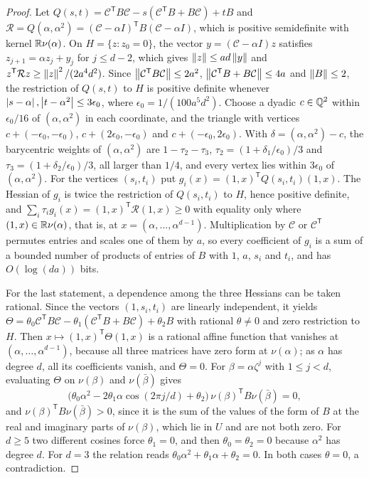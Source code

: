 \begin{proof}
Let $Q(s,t)=\mathcal C^{\mathsf T}B\mathcal C-s(\mathcal C^{\mathsf
T}B+B\mathcal C)+tB$ and $\mathcal R=Q(\alpha,\alpha^2)=(\mathcal C-\alpha
I)^{\mathsf T}B(\mathcal C-\alpha I)$, which is positive semidefinite with
kernel $\mathbb R\nu(\alpha)$. On $H=\{z:z_0=0\}$, the vector $y=(\mathcal C-\alpha
I)z$ satisfies $z_{j+1}=\alpha z_j+y_j$ for $j\le d-2$, which gives
$\left\lVert z\right\rVert\le ad\left\lVert y\right\rVert$ and $z^{\mathsf T}\mathcal Rz\ge\left\lVert z\right\rVert^2/(2a^4d^2)$.
Since $\left\lVert\mathcal C^{\mathsf T}B\mathcal C\right\rVert\le2a^2$,
$\left\lVert\mathcal C^{\mathsf T}B+B\mathcal C\right\rVert\le4a$ and $\left\lVert B\right\rVert\le2$, the
restriction of $Q(s,t)$ to $H$ is positive definite whenever
$\left\lvert s-\alpha\right\rvert,\left\lvert t-\alpha^2\right\rvert\le3\epsilon_0$, where
$\epsilon_0=1/(100a^5d^2)$. Choose a dyadic $c\in\mathbb Q^2$ within $\epsilon_0/16$
of $(\alpha,\alpha^2)$ in each coordinate, and the triangle with vertices
$c+(-\epsilon_0,-\epsilon_0)$, $c+(2\epsilon_0,-\epsilon_0)$ and
$c+(-\epsilon_0,2\epsilon_0)$. With $\delta=(\alpha,\alpha^2)-c$, the
barycentric weights of $(\alpha,\alpha^2)$ are $1-\tau_2-\tau_3$,
$\tau_2=(1+\delta_1/\epsilon_0)/3$ and $\tau_3=(1+\delta_2/\epsilon_0)/3$, all
larger than $1/4$, and every vertex lies within $3\epsilon_0$ of
$(\alpha,\alpha^2)$. For the vertices $(s_i,t_i)$ put
$g_i(x)=(1,x)^{\mathsf T}Q(s_i,t_i)(1,x)$. The Hessian of $g_i$ is twice the
restriction of $Q(s_i,t_i)$ to $H$, hence positive definite, and
$\sum_i\tau_ig_i(x)=(1,x)^{\mathsf T}\mathcal R(1,x)\ge0$ with equality only
where $(1,x)\in\mathbb R\nu(\alpha)$, that is, at $x=(\alpha,\ldots,\alpha^{d-1})$.
Multiplication by $\mathcal C$ or $\mathcal C^{\mathsf T}$ permutes entries
and scales one of them by $a$, so every coefficient of $g_i$ is a sum of a
bounded number of products of entries of $B$ with $1$, $a$, $s_i$ and $t_i$,
and has $O(\log(da))$ bits.

For the last statement, a dependence among the three Hessians can be taken
rational. Since the vectors $(1,s_i,t_i)$ are linearly independent, it yields
$\Theta=\theta_0\mathcal C^{\mathsf T}B\mathcal C-\theta_1(\mathcal C^{\mathsf
T}B+B\mathcal C)+\theta_2B$ with rational $\theta\ne0$ and zero restriction to
$H$. Then $x\mapsto(1,x)^{\mathsf T}\Theta(1,x)$ is a rational affine function
that vanishes at $(\alpha,\ldots,\alpha^{d-1})$, because all three matrices
have zero form at $\nu(\alpha)$; as $\alpha$ has degree $d$, all its
coefficients vanish, and $\Theta=0$. For $\beta=\alpha\zeta^j$ with $1\le j<d$,
evaluating $\Theta$ on $\nu(\beta)$ and $\nu(\bar\beta)$ gives
\[
\bigl(\theta_0\alpha^2-2\theta_1\alpha\cos(2\pi j/d)+\theta_2\bigr)\,
\nu(\beta)^{\mathsf T}B\nu(\bar\beta)=0,
\]
and $\nu(\beta)^{\mathsf T}B\nu(\bar\beta)>0$, since it is the sum of the
values of the form of $B$ at the real and imaginary parts of $\nu(\beta)$,
which lie in $U$ and are not both zero. For $d\ge5$ two different cosines
force $\theta_1=0$, and then $\theta_0=\theta_2=0$ because $\alpha^2$ has degree
$d$. For $d=3$ the relation reads $\theta_0\alpha^2+\theta_1\alpha+\theta_2=0$.
In both cases $\theta=0$, a contradiction.
\end{proof}

